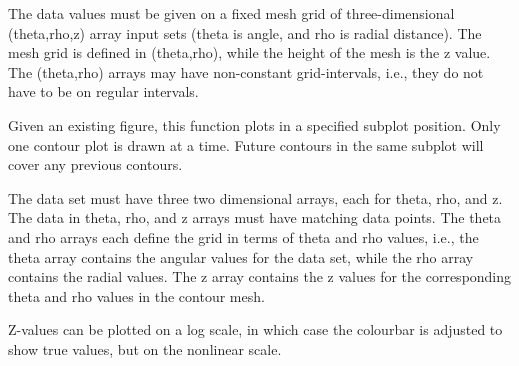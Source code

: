 \documentclass[a4paper,10pt,english]{sphinxmanual}
\begin{document}
\begin{fulllineitems}
\begin{fulllineitems}
The data values must be given on a fixed mesh grid of three-dimensional (theta,rho,z)
array input sets (theta is angle,  and rho is radial distance). The mesh grid is 
defined in (theta,rho), while the height of the mesh is the z value. The 
(theta,rho) arrays may have non-constant grid-intervals, i.e., they do not 
have to be on regular intervals.

Given an existing figure, this function plots in a specified subplot position. 
Only one contour plot is drawn at a time.  Future contours in the same subplot 
will cover any previous contours.

The data set must have three two dimensional arrays, each for theta, rho, and z.  
The data in theta, rho, and z arrays must have matching data points.  
The theta and rho arrays each define the grid in terms of theta and rho values,
i.e., the theta array contains the angular values for the data set, while the 
rho array contains the radial values.  The z array contains the z values for the 
corresponding theta and rho values in the contour mesh.

Z-values can be plotted on a log scale, in which case the colourbar is adjusted 
to show true values, but on the nonlinear scale.


\end{fulllineitems}
\end{fulllineitems}
\end{document}
